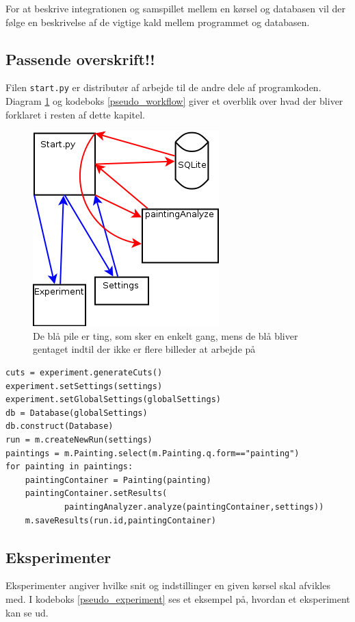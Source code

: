 {
{\sffamily
For at beskrive integrationen og samspillet mellem en kørsel og
databasen vil der følge en beskrivelse af de vigtige kald mellem
programmet og databasen.
}

\subsection{Passende overskrift!!}
Filen \texttt{start.py} er distributør af arbejde til de andre dele af
programkoden.  Diagram \ref{start_workflow} og kodeboks
\ref{pseudo_workflow} giver et overblik over hvad der bliver forklaret i
resten af dette kapitel.

\begin{figure}[h!]
	\begin{center}
		\includegraphics[scale=0.5]{afsnit/implementation/billeder/workflow_start_py.png}
	\end{center}
	\caption{De blå pile er ting, som sker en enkelt gang, mens de blå
	\label{start_workflow}
	bliver gentaget indtil der ikke er flere billeder at arbejde på}
\end{figure}

\begin{lstlisting}[caption={Pseudokode for start}, captionpos=b,
    frame=tb, label={pseudo_workflow}, float=h]
cuts = experiment.generateCuts()
experiment.setSettings(settings)
experiment.setGlobalSettings(globalSettings)
db = Database(globalSettings)
db.construct(Database)
run = m.createNewRun(settings)
paintings = m.Painting.select(m.Painting.q.form=="painting")
for painting in paintings:
    paintingContainer = Painting(painting)
    paintingContainer.setResults(
            paintingAnalyzer.analyze(paintingContainer,settings))
    m.saveResults(run.id,paintingContainer)
\end{lstlisting}
\subsection{Eksperimenter}
Eksperimenter angiver hvilke snit og indstillinger en given kørsel skal
afvikles med. I kodeboks \ref{pseudo_experiment} ses et eksempel på,
hvordan et eksperiment kan se ud.

}
